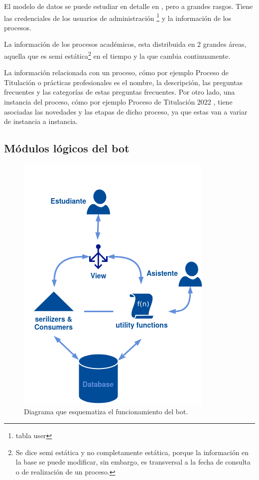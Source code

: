        \par El modelo de datos se puede estudiar en detalle en \cite{ARANCIBIA2021}, pero a grandes rasgos. Tiene las credenciales de los usuarios de administración \footnote{tabla user} y la información de los procesos.

        \par La información de los procesos académicos, esta distribuida en 2 grandes áreas, aquella que es semi estática\footnote{Se dice semi estática y no completamente estática, porque la información en la base se puede modificar, sin embargo, es transversal a la fecha de consulta o de realización de un proceso.} en el tiempo y la que cambia continuamente. 

        \par La información relacionada con un proceso, cómo por ejemplo \guillemotleft Proceso de Titulación \guillemotright o \guillemotleft prácticas profesionales \guillemotright es el nombre, la descripción, las preguntas frecuentes y las categorías de estas preguntas frecuentes. Por otro lado, una instancia del proceso, cómo por ejemplo  \guillemotleft Proceso de Titulación 2022 \guillemotright, tiene asociadas las novedades y las etapas de dicho proceso, ya que estas van a variar de instancia a instancia.

    \subsection{Módulos lógicos del bot}

        \begin{figure}[h!]
            \centering
            \includegraphics[scale=0.5]{media/imagenes/trabajo_previo/Bot_Modules-old.png}
            \caption[Funcionamiento del Bot]{Diagrama que esquematiza el funcionamiento del bot.}
            \label{fig:bot-work-old}
        \end{figure}

